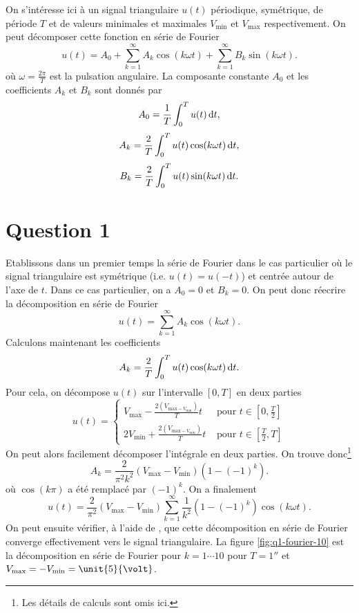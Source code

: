 

On s'intéresse ici à un signal triangulaire $u(t)$
périodique, symétrique, de période $T$ et de valeurs 
minimales et maximales $V_{\text{min}}$ et $V_{\text{max}}$
respectivement. On peut décomposer cette fonction
en série de Fourier
\[ u(t) = A_0 + \sum_{k=1}^{\infty} A_k\cos(k\omega t)
+ \sum_{k=1}^{\infty} B_k\sin(k\omega t). \]
où $\omega = \frac{2\pi}{T}$ est la pulsation angulaire.
La composante constante $A_0$ et les coefficients $A_k$
et $B_k$ sont donnés par 
\[ A_0 = \frac{1}{T} \int_0^T u(t)\operatorname{d}\! t,\]
\[ A_k = \frac{2}{T} \int_0^T u(t)\cos(k\omega t)\operatorname{d}\! t,\]
\[ B_k = \frac{2}{T} \int_0^T u(t)\sin(k\omega t)\operatorname{d}\! t.\]

\section{Question 1}
Etablissons dans un premier temps la série de Fourier
dans le cas particulier où le signal triangulaire
est symétrique (i.e. $u(t) = u(-t)$) et centrée autour
de l'axe de $t$. Dans ce cas particulier, on a $A_0 = 0$
et $B_k = 0$. On peut donc réecrire la décomposition
en série de Fourier 
\[ u(t) = \sum_{k=1}^{\infty} A_k\cos(k\omega t).\]
Calculons maintenant les coefficients
\[ A_k = \frac{2}{T} \int_0^T u(t)\cos(k\omega t)\operatorname{d}\! t.\]
Pour cela, on décompose $u(t)$ sur l'intervalle $[0,T]$
en deux parties
\[ u(t) =
	\left\{
		\begin{array}{rl}
			V_{\text{max}} - \frac{2(V_{\text{max}-V_{\text{min}}})}{T}t 	
			&\text{ pour } t \in [0,\frac{T}{2}]  \\
			2V_{\text{min}} + \frac{2(V_{\text{max}-V_{\text{min}}})}{T}t 
			&\text{ pour }t \in [\frac{T}{2},T] 
		\end{array}
	\right.
\]
On peut alors facilement décomposer l'intégrale en deux
parties. On trouve donc\footnote{Les détails
de calculs sont omis ici.}
\[ A_k = \frac{2}{\pi^2k^2}(V_{\text{max}}-V_{\text{min}})
(1 - (-1)^k).\]
où $\cos(k\pi)$ a été remplacé par $(-1)^k$.
On a finalement
\[ u(t) = \frac{2}{\pi^2}(V_{\text{max}}-V_{\text{min}})
\sum_{k=1}^{\infty} \frac{1}{k^2}(1 - (-1)^k)\cos(k\omega t).\]
On peut ensuite vérifier, à l'aide de \matlab,
que cette décomposition en série de Fourier
converge effectivement vers le signal triangulaire.
La figure \ref{fig:q1-fourier-10} est la décomposition
en série de Fourier pour $k = 1\cdots10$ pour 
$T = \unit{1}{\second}$ et $V_{\text{max}} = 
-V_{\text{min}} = \unit{5}{\volt}$.

